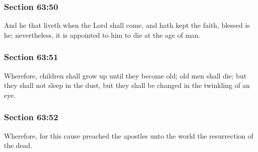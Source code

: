 	\subsubsection{Section 63:50} %
		\label{DC63-50}

		And he that liveth when the Lord shall come, and hath kept the faith, blessed is he; nevertheless, it is appointed to him to die at the age of man.


	\subsubsection{Section 63:51} %
		\label{DC63-51}

		Wherefore, children shall grow up until they become old; old men shall die; but they shall not sleep in the dust, but they shall be changed in the twinkling of an eye.


	\subsubsection{Section 63:52} %
		\label{DC63-52}

		Wherefore, for this cause preached the apostles unto the world the resurrection of the dead.


